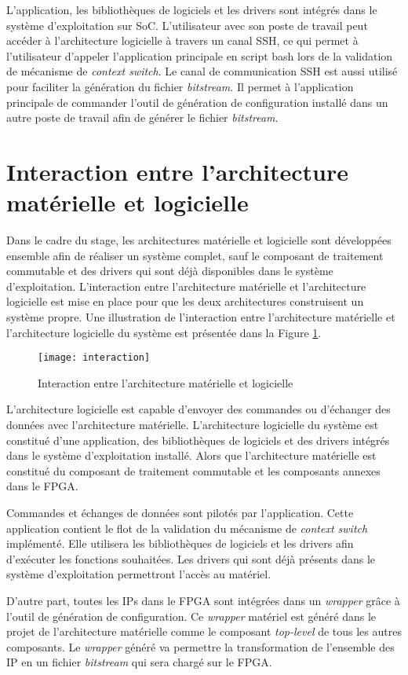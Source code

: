L'application, les bibliothèques de logiciels et les drivers sont intégrés dans
le système d'exploitation sur SoC. L'utilisateur avec son poste de travail peut accéder à
l'architecture logicielle à travers un canal \gls{SSH},
ce qui permet à l'utilisateur d'appeler l'application principale en script bash lors de la validation de mécanisme de \emph{context switch}.
Le canal de communication SSH est aussi utilisé pour faciliter la génération du fichier \emph{bitstream}.
Il permet à l'application principale de commander l'outil de génération de configuration installé dans un
autre poste de travail afin de générer le fichier \emph{bitstream}.

\section{Interaction entre l'architecture matérielle et logicielle}

Dans le cadre du stage, les architectures matérielle et logicielle sont
développées ensemble afin de réaliser un système complet,
sauf le composant de traitement commutable et des drivers qui sont déjà disponibles dans
le système d'exploitation.
L'interaction entre l'architecture matérielle et l'architecture logicielle est mise en place
pour que les deux architectures construisent un système propre.
Une illustration de l'interaction entre l'architecture matérielle 
et l'architecture logicielle du système est présentée dans la Figure \ref{fig:interaction}.

\begin{figure}[h]
	\centering
	\texttt{[image: interaction]}
	\caption{Interaction entre l'architecture matérielle et logicielle}
	\label{fig:interaction}
	\vspace{-2mm}
\end{figure}

L'architecture logicielle est capable d'envoyer des commandes ou
d'échanger des données avec l'architecture matérielle.
L'architecture logicielle du système est constitué d'une application, des bibliothèques de logiciels et des drivers
intégrés dans le système d'exploitation installé. Alors que l'architecture matérielle
est constitué du composant de traitement commutable et les composants annexes dans le FPGA.

Commandes et échanges de données sont pilotés par l'application. Cette application
contient le flot de la validation du mécanisme de \emph{context switch} implémenté.
Elle utilisera les bibliothèques de logiciels et les drivers afin d'exécuter les fonctions souhaitées.
Les drivers qui sont déjà présents dans le système d'exploitation permettront l'accès au
matériel.

D'autre part, toutes les IPs dans le FPGA sont intégrées dans un \emph{wrapper} grâce
à l'outil de génération de configuration. Ce \emph{wrapper} matériel est généré dans le projet de l'architecture matérielle
comme le composant \emph{top-level} de tous les autres composants.
Le \emph{wrapper} généré va permettre la transformation de l'ensemble des IP en un fichier \emph{bitstream} qui sera
chargé sur le FPGA.